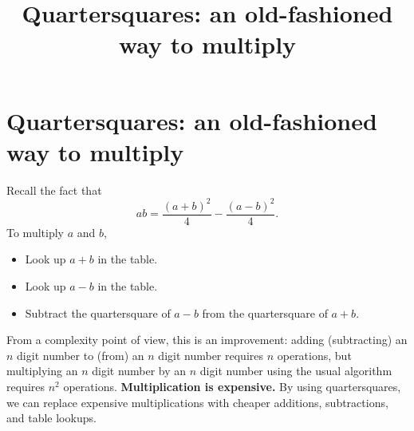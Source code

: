 \documentclass[12pt]{article}
\title{Quartersquares: an old-fashioned way to multiply}
\begin{document}
\section*{Quartersquares: an old-fashioned way to multiply}

Recall the fact that
$$
ab = \frac{(a+b)^2}{4} - \frac{(a-b)^2}{4}.
$$
To multiply $a$ and $b$,
\begin{itemize}
\item Look up $a+b$ in the table.
\item Look up $a-b$ in the table.
\item Subtract the quartersquare of $a-b$ from the quartersquare of $a+b$.
\end{itemize}
From a complexity point of view, this is an improvement: adding
(subtracting) an $n$ digit number to (from) an $n$ digit number
requires $n$ operations, but multiplying an $n$ digit number by an $n$
digit number using the usual algorithm requires $n^2$ operations.
\textbf{Multiplication is expensive.}  By using quartersquares, we can
replace expensive multiplications with cheaper additions,
subtractions, and table lookups.

\vfill
\end{document}

